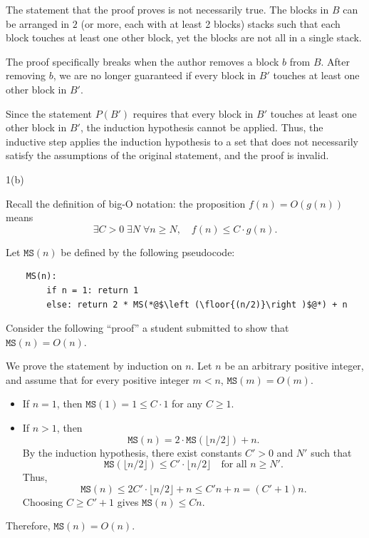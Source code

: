 \documentclass[12pt]{article}
\begin{document}
\begin{solution}
    \bbni

     The statement that the proof proves is not necessarily true. The blocks in $B$ can be arranged in $2$ (or more, each with at least 2 blocks) stacks such that each block touches at least one other block, yet the blocks are not all in a single stack. 

     The proof specifically breaks when the author removes a block $b$ from $B$. After removing $b$, we are no longer guaranteed if every block in $B'$ touches at least one other block in $B'$.  
     
     Since the statement $P(B')$ requires that every block in $B'$ touches at least one other block in $B'$, the induction hypothesis cannot be applied. Thus, the inductive step applies the induction hypothesis to a set that does not necessarily satisfy the assumptions of the original statement, and the proof is invalid.

\end{solution}

\newpage 

\begin{problem}{1(b)}

    Recall the definition of big-O notation: the proposition $f(n) = O(g(n))$ means
    \[
    \exists C > 0 \; \exists N \; \forall n \ge N,\quad f(n) \le C \cdot g(n).
    \]

    Let $\texttt{MS}(n)$ be defined by the following pseudocode:
    \begin{lstlisting}
    MS(n):
        if n = 1: return 1
        else: return 2 * MS(*@$\left (\floor{(n/2)}\right )$@*) + n
    \end{lstlisting}

  Consider the following ``proof” a student submitted to show that $\texttt{MS}(n) = O(n)$.

    We prove the statement by induction on $n$. Let $n$ be an arbitrary positive integer, and
    assume that for every positive integer $m < n$, $\texttt{MS}(m) = O(m)$.

    \begin{itemize}
    \item If $n = 1$, then $\texttt{MS}(1) = 1 \le C \cdot 1$ for any $C \ge 1$.

    \item If $n > 1$, then
    \[
    \texttt{MS}(n) = 2 \cdot \texttt{MS}(\lfloor n/2 \rfloor) + n.
    \]
    By the induction hypothesis, there exist constants $C' > 0$ and $N'$ such that
    \[
    \texttt{MS}(\lfloor n/2 \rfloor) \le C' \cdot \lfloor n/2 \rfloor \quad \text{for all } n \ge N'.
    \]
    Thus,
    \[
    \texttt{MS}(n) \le 2 C' \cdot \lfloor n/2 \rfloor + n \le C' n + n = (C' + 1)n.
    \]
    Choosing $C \ge C' + 1$ gives $\texttt{MS}(n) \le C n$.
    \end{itemize}

    Therefore, $\texttt{MS}(n) = O(n)$.    
\end{problem}
\end{document}
